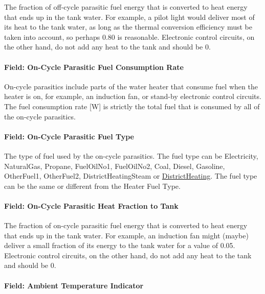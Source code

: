 The fraction of off-cycle parasitic fuel energy that is converted to heat energy that ends up in the tank water. For example, a pilot light would deliver most of its heat to the tank water, as long as the thermal conversion efficiency must be taken into account, so perhaps 0.80 is reasonable. Electronic control circuits, on the other hand, do not add any heat to the tank and should be 0.

\paragraph{Field: On-Cycle Parasitic Fuel Consumption Rate}\label{field-on-cycle-parasitic-fuel-consumption-rate}

On-cycle parasitics include parts of the water heater that consume fuel when the heater is on, for example, an induction fan, or stand-by electronic control circuits. The fuel consumption rate {[}W{]} is strictly the total fuel that is consumed by all of the on-cycle parasitics.

\paragraph{Field: On-Cycle Parasitic Fuel Type}\label{field-on-cycle-parasitic-fuel-type}

The type of fuel used by the on-cycle parasitics. The fuel type can be Electricity, NaturalGas, Propane, FuelOilNo1, FuelOilNo2, Coal, Diesel, Gasoline, OtherFuel1, OtherFuel2, DistrictHeatingSteam or \hyperref[districtheating]{DistrictHeating}. The fuel type can be the same or different from the Heater Fuel Type.

\paragraph{Field: On-Cycle Parasitic Heat Fraction to Tank}\label{field-on-cycle-parasitic-heat-fraction-to-tank}

The fraction of on-cycle parasitic fuel energy that is converted to heat energy that ends up in the tank water. For example, an induction fan might (maybe) deliver a small fraction of its energy to the tank water for a value of 0.05. Electronic control circuits, on the other hand, do not add any heat to the tank and should be 0.

\paragraph{Field: Ambient Temperature Indicator}\label{field-ambient-temperature-indicator-000}

